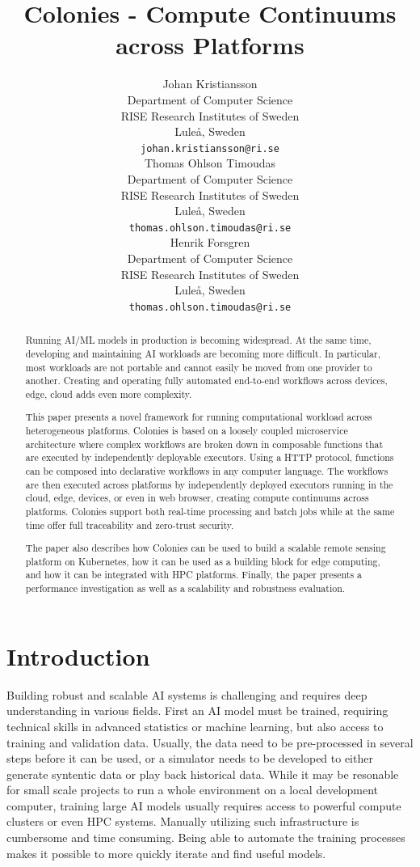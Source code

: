 \documentclass{article}
\title{Colonies - Compute Continuums across Platforms}
\author{{\hspace{1mm}Johan Kristiansson} \\
	Department of Computer Science \\
	RISE Research Institutes of Sweden \\
	Luleå, Sweden \\
	\texttt{johan.kristiansson@ri.se} \\
	\And
	{\hspace{1mm}Thomas Ohlson Timoudas} \\
	Department of Computer Science \\
	RISE Research Institutes of Sweden \\
	Luleå, Sweden \\
	\texttt{thomas.ohlson.timoudas@ri.se} \\
	\And
	{\hspace{1mm}Henrik Forsgren} \\
	Department of Computer Science \\
	RISE Research Institutes of Sweden \\
	Luleå, Sweden \\
	\texttt{thomas.ohlson.timoudas@ri.se} \\
}
\begin{document}
\maketitle

\begin{abstract}
Running AI/ML models in production is becoming widespread. At the same time, developing and maintaining AI workloads are becoming more difficult. In particular, most workloads are not portable and cannot easily be moved from one provider to another. Creating and operating fully automated end-to-end workflows across devices, edge, cloud adds even more complexity.

This paper presents a novel framework for running computational workload across heterogeneous platforms. Colonies is based on a loosely coupled microservice architecture where complex workflows are broken down in composable functions that are executed by independently deployable executors. Using a HTTP protocol, functions can be composed into declarative workflows in any computer language. The workflows are then executed across platforms by independently deployed executors running in the cloud, edge, devices, or even in web browser, creating compute continuums across platforms. Colonies support both real-time processing and batch jobs while at the same time offer full traceability and zero-trust security.

The paper also describes how Colonies can be used to build a scalable remote sensing platform on Kubernetes, how it can be used as a building block for edge computing, and how it can be integrated with HPC platforms. Finally, the paper presents a performance investigation as well as a scalability and robustness evaluation. 
\end{abstract}


\section{Introduction}
Building robust and scalable AI systems is challenging and requires deep understanding in various fields. First an AI model must be trained, requiring technical skills in advanced statistics or machine learning, but also access to training and validation data. Usually, the data need to be pre-processed in several steps before it can be used, or a simulator needs to be developed to either generate syntentic data or play back historical data. While it may be resonable for small scale projects to run a whole environment on a local development computer, training large AI models usually requires access to powerful compute clusters or even HPC systems. Manually utilizing such infrastructure is cumbersome and time consuming. Being able to automate the training processes makes it possible to more quickly iterate and find useful models.  
\end{document}
